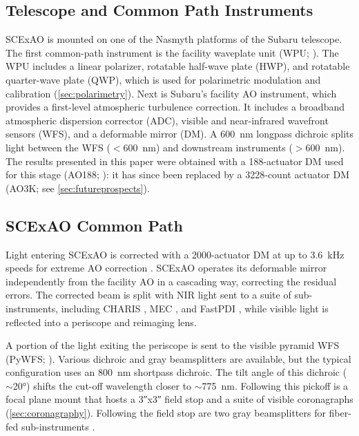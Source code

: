 \subsection{Telescope and Common Path Instruments}

SCExAO is mounted on one of the Nasmyth platforms of the Subaru telescope. The first common-path instrument is the facility waveplate unit (WPU; \citealp{watanabe_near-infrared_2018}). The WPU includes a linear polarizer, rotatable half-wave plate (HWP), and rotatable quarter-wave plate (QWP), which is used for polarimetric modulation and calibration (\autoref{sec:polarimetry}). Next is Subaru's facility AO instrument, which provides a first-level atmospheric turbulence correction. It includes a broadband atmospheric dispersion corrector (ADC), visible and near-infrared wavefront sensors (WFS), and a deformable mirror (DM). A \SI{600}{\nano\meter} longpass dichroic splits light between the WFS ($<$\SI{600}{\nano\meter}) and downstream instruments ($>$\SI{600}{\nano\meter}). The results presented in this paper were obtained with a 188-actuator DM used for this stage (AO188; \citealp{minowa_performance_2010}): it has since been replaced by a 3228-count actuator DM (AO3K; see \autoref{sec:futureprospects}). 

\subsection{SCExAO Common Path}

Light entering SCExAO is corrected with a 2000-actuator DM at up to \SI{3.6}{\kilo\hertz} speeds for extreme AO correction \citep{lozi_new_2020,ahn_scexao_2021}. SCExAO operates its deformable mirror independently from the facility AO in a cascading way, correcting the residual errors. The corrected beam is split with NIR light sent to a suite of sub-instruments, including CHARIS \citep{groff_charis_2015}, MEC \citep{steiger_probing_2022}, and FastPDI \citep{lozi_status_2020}, while visible light is reflected into a periscope and reimaging lens.

A portion of the light exiting the periscope is sent to the visible pyramid WFS (PyWFS; \citealp{lozi_visible_2019}). Various dichroic and gray beamsplitters are available, but the typical configuration uses an \SI{800}{\nano\meter} shortpass dichroic. The tilt angle of this dichroic ($\sim$\ang{20}) shifts the cut-off wavelength closer to $\sim$\SI{775}{\nano\meter}. Following this pickoff is a focal plane mount that hosts a \ang{;;3}x\ang{;;3} field stop and a suite of visible coronagraphs (\autoref{sec:coronagraphy}). Following the field stop are two gray beamsplitters for fiber-fed sub-instruments \citep{vievard_single-aperture_2023,vievard_photonic_2023}.

